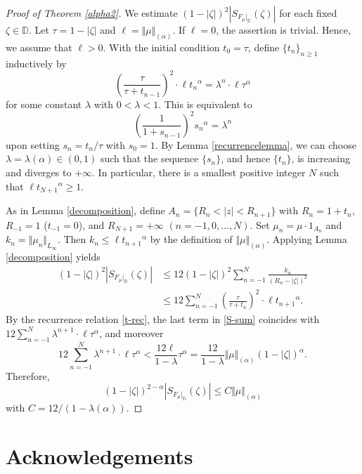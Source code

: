 \documentclass[amstex]{amsart}
\theoremstyle{definition}
\theoremstyle{remark}
\numberwithin{equation}{section}
\begin{document}
\begin{proof}[Proof of Theorem \ref{alpha2}]
We estimate $(1-|\zeta|)^2|S_{F_\mu|_\mathbb D}(\zeta)|$ for each fixed $\zeta \in \mathbb D$.
Let $\tau=1-|\zeta|$ and $\ell=\Vert \mu \Vert_{(\alpha)}$.
If $\ell=0$, the assertion is trivial. Hence, we assume that $\ell>0$.
With the initial condition $t_0=\tau$, define $\{t_n\}_{n\geq 1}$ inductively by
\begin{equation}\label{t-rec}
\left(\frac{\tau}{\tau+t_{n-1}}\right)^2 \cdot \ell {t_n}^\alpha=
\lambda^n \cdot \ell \tau^\alpha 
\end{equation}
for some constant $\lambda$ with $0<\lambda<1$.
This is equivalent to
$$
\left(\frac{1}{1+s_{n-1}} \right)^2 {s_n}^\alpha=\lambda^n 
$$
upon setting $s_n=t_n/\tau$ with $s_0=1$.
By Lemma \ref{recurrencelemma},
we can choose $\lambda=\lambda(\alpha) \in (0,1)$ such that the sequence $\{s_n\}$, and hence $\{t_n\}$,
is increasing and diverges to $+\infty$.
In particular, there is a smallest positive integer $N$ such that $\ell{t_{N+1}}^\alpha \geq 1$.

As in Lemma \ref{decomposition}, define 
$A_n=\{R_n < |z| < R_{n+1}\}$ with
$R_n=1+t_n$, $R_{-1}=1$ ($t_{-1}=0$), and $R_{N+1}=+\infty$ $(n=-1,0,\ldots ,N)$.
Set $\mu_n=\mu \cdot 1_{A_n}$ and $k_n=\Vert \mu_n \Vert_{L_\infty}$. Then
$k_n \leq \ell {t_{n+1}}^\alpha$ by the definition of $\Vert \mu \Vert_{(\alpha)}$.
Applying Lemma \ref{decomposition} yields
\begin{align}\label{S-sum}
(1-|\zeta|)^2|S_{F_\mu|_\mathbb D}(\zeta)| &\leq 12 (1-|\zeta|)^2 \sum_{n=-1}^{N} 
\frac{k_n}{(R_n-|\zeta|)^2}\\ 
&\leq 12 \sum_{n=-1}^{N} \left(\frac{\tau}{\tau+t_n}\right)^2 \cdot \ell {t_{n+1}}^\alpha.
\end{align}
By the recurrence relation \eqref{t-rec}, 
the last term in \eqref{S-sum} coincides with $12\sum_{n=-1}^{N}\lambda^{n+1} \cdot \ell \tau^\alpha$, and moreover
$$
12 \sum_{n=-1}^{N} \lambda^{n+1} \cdot \ell \tau^\alpha <\frac{12 \ell}{1-\lambda} \tau^\alpha
=\frac{12}{1-\lambda} \Vert \mu \Vert_{(\alpha)} (1-|\zeta|)^\alpha.
$$
Therefore,
$$
(1-|\zeta|)^{2-\alpha}|S_{F_\mu|_{\mathbb D}}(\zeta)| \leq C \Vert \mu \Vert_{(\alpha)}
$$
with $C=12/(1-\lambda(\alpha))$.
\end{proof}


\section*{Acknowledgements} 
\end{document}
